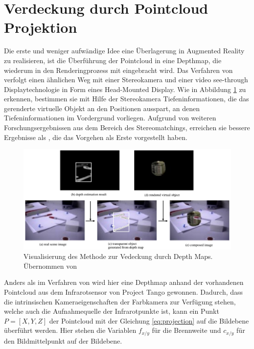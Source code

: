 \section{Verdeckung durch Pointcloud Projektion} \label{sec:pc-projection}

Die erste und weniger aufwändige Idee eine Überlagerung in Augmented Reality zu realisieren, ist die Überführung der Pointcloud in eine Depthmap, die wiederum in den Renderingprozess mit eingebracht wird. Das Verfahren von \citet{kanbara2000stereoscopic} verfolgt einen ähnlichen Weg mit einer Stereokamera und einer video see-through Displaytechnologie in Form eines Head-Mounted Display. Wie in Abbildung \ref{fig:stereo-depth-map} zu erkennen, bestimmen sie mit Hilfe der Stereokamera Tiefeninformationen, die das gerenderte virtuelle Objekt an den Positionen ausspart, an denen Tiefeninformationen im Vordergrund vorliegen. Aufgrund von weiteren Forschungsergebnissen aus dem Bereich des Stereomatchings, erreichen sie bessere Ergebnisse als \citet{wloka1995resolving}, die das Vorgehen als Erste vorgestellt haben.

\begin{figure}[h]
  \centering
	\includegraphics[width=1.0\textwidth]{content/images/methods/stereo-depth-map.png} 
  \caption{Visualisierung des Methode zur Vedeckung durch Depth Maps. Übernommen von \citet{kanbara2000stereoscopic}}
  \label{fig:stereo-depth-map}
\end{figure}

Anders als im Verfahren von \citet{kanbara2000stereoscopic} wird hier eine Depthmap anhand der vorhandenen Pointcloud aus dem Infrarotsensor von Project Tango gewonnen. Dadurch, dass die intrinsischen Kameraeigenschaften der Farbkamera zur Verfügung stehen, welche auch die Aufnahmequelle der Infrarotpunkte ist, kann ein Punkt \(P = [X, Y, Z]\) der Pointcloud mit der Gleichung \ref{eq:projection} auf die Bildebene überführt werden. Hier stehen die Variablen \(f_{x/y}\) für die Brennweite und \(c_{x/y}\) für den Bildmittelpunkt auf der Bildebene. \citep{Tango90:online}


